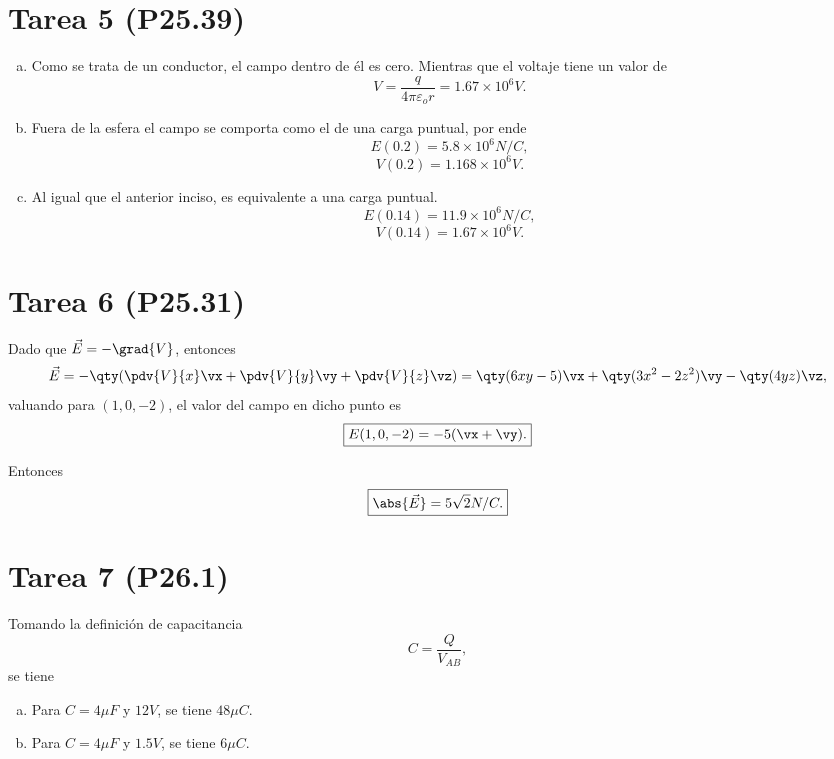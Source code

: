 \section*{Tarea 5 (P25.39)}

\begin{enumerate}[a)]
	\item Como se trata de un conductor, el campo dentro de él es cero. Mientras que el voltaje tiene un valor de
		$$ V = \frac{q}{4\pi \varepsilon _o r} = 1.67\times 10^{6} V. $$
	\item Fuera de la esfera el campo se comporta como el de una carga puntual, por ende
		$$ E(0.2) = 5.8\times 10^{6} N/C, $$
		$$ V(0.2) = 1.168\times 10^{6} V. $$
	\item Al igual que el anterior inciso, es equivalente a una carga puntual.
		$$ E(0.14) = 11.9\times 10^{6} N/C, $$
		$$ V(0.14) = 1.67\times 10^{6} V. $$
\end{enumerate}











\section*{Tarea 6 (P25.31)}

Dado que $\vec{E} = -\grad{V}$, entonces
	$$ \vec{E} = -\qty(\pdv{V}{x} \vx + \pdv{V}{y} \vy + \pdv{V}{z} \vz) = \qty(6xy - 5) \vx + \qty(3x^2 - 2z^2) \vy - \qty(4yz) \vz , $$
valuando para $(1,0,-2)$, el valor del campo en dicho punto es
	$$ \boxed{ E(1,0,-2) = -5(\vx + \vy). } $$
	
Entonces
	$$ \boxed{ \abs{\vec{E}} = 5\sqrt{2} N/C .} $$








\section*{Tarea 7 (P26.1)}


Tomando la definición de capacitancia
	$$ C = \frac{Q}{V_{AB}}, $$
se tiene
	\begin{enumerate}[a)]
		\item Para $C = 4\mu F$ y $12V$, se tiene $48\mu C$.
		\item Para $C = 4\mu F$ y $1.5V$, se tiene $6\mu C$.
	\end{enumerate}







